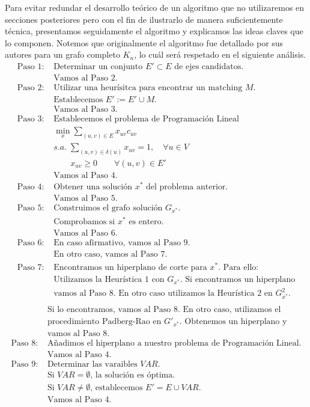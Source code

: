 \documentclass[twoside,a4paper,openright,12pt,tikz]{book}
\begin{document}
Para evitar redundar el desarrollo teórico de un algoritmo que no utilizaremos en secciones posteriores pero con el fin de ilustrarlo de manera suficientemente técnica, presentamos seguidamente el algoritmo y explicamos las ideas claves que lo componen. Notemos que originalmente el algoritmo fue detallado por sus autores para un grafo completo $K_n$, lo cuál será respetado en el siguiente análisis.
\begin{align*}
\text{Paso 1: }&\text{Determinar un conjunto $E'\subset E$ de ejes candidatos.}\\
&\text{Vamos al Paso 2.}\\
\text{Paso 2: }&\text{Utilizar una heurísitca para encontrar un matching $M$.}\\
&\text{Establecemos $E':=E'\cup M$.}\\
&\text{Vamos al Paso 3.}\\
\text{Paso 3: }& \text{Establecemos el problema de Programación Lineal}\\
& \min_x  \sum_{(u,v) \in E}x_{uv}c_{uv}\\
&s.a.\;\sum_{(u,v)\in\delta(u)} x_{uv} = 1, \quad \forall u \in V\\
&\qquad x_{uv} \geq 0 \qquad \forall(u,v)\in E'\\
&\text{Vamos al Paso 4.}\\
\text{Paso 4: }&\text{Obtener una solución $x^*$ del problema anterior.}\\
&\text{Vamos al Paso 5.}\\
\text{Paso 5: }&\text{Construimos el grafo solución $G_{x^*}$.}\\
&\text{Comprobamos si $x^*$ es entero.}\\
&\text{Vamos al Paso 6.}\\
\text{Paso 6: }& \text{En caso afirmativo, vamos al Paso 9.}\\
&\text{En otro caso, vamos al Paso 7.}\\
\text{Paso 7: }&\text{Encontramos un hiperplano de corte para $x^*$. Para ello:}\\
&\text{Utilizamos la Heurística 1 con $G_{x^*}$. Si encontramos un hiperplano}\\
&\text{vamos al Paso 8. En otro caso utilizamos la Heurística 2 en $G^2_{x^*}$.}\\
\end{align*}
\begin{align*}
&\text{Si lo encontramos, vamos al Paso 8. En otro caso, utilizamos el}\\
&\text{procedimiento Padberg-Rao en $G'_{x^*}$. Obtenemos un hiperplano y}\\
&\text{vamos al Paso 8.}\\
\text{Paso 8: }&\text{Añadimos el hiperplano a nuestro problema de Programación Lineal.}\\
&\text{Vamos al Paso 4.}\\
\text{Paso 9: }&\text{Determinar las varaibles $VAR$.}\\
&\text{Si $VAR=\emptyset$, la solución es óptima. }\\
&\text{Si $VAR\neq\emptyset$, establecemos $E'=E\cup VAR$.}\\
&\text{Vamos al Paso 4.}
\end{align*}
\end{document}
